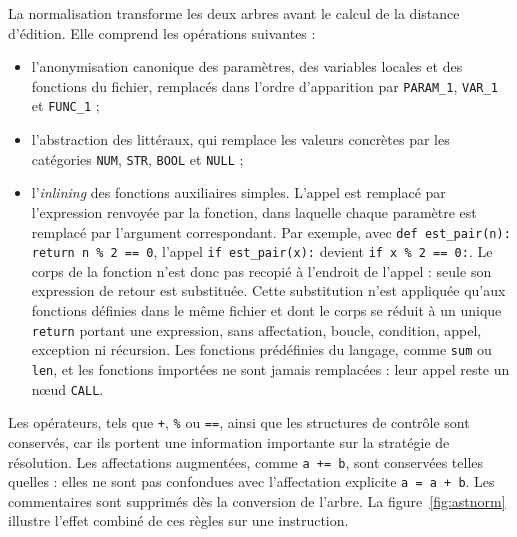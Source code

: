 \documentclass[12pt,a4paper,oneside]{report}
\begin{document}
La normalisation transforme les deux arbres avant le calcul de la distance
d'édition. Elle comprend les opérations suivantes :
\begin{itemize}
  \item l'anonymisation canonique des paramètres, des variables locales et des
        fonctions du fichier, remplacés dans l'ordre d'apparition par
        \texttt{PARAM\_1}, \texttt{VAR\_1} et \texttt{FUNC\_1} ;
  \item l'abstraction des littéraux, qui remplace les valeurs concrètes par les
        catégories \texttt{NUM}, \texttt{STR}, \texttt{BOOL} et \texttt{NULL} ;
  \item l'\emph{inlining} des fonctions auxiliaires simples. L'appel est
        remplacé par l'expression renvoyée par la fonction, dans laquelle
        chaque paramètre est remplacé par l'argument correspondant. Par
        exemple, avec \texttt{def est\_pair(n): return n \% 2 == 0},
        l'appel \texttt{if est\_pair(x):} devient \texttt{if x \% 2 == 0:}.
        Le corps de la fonction n'est donc pas recopié à l'endroit de
        l'appel : seule son expression de retour est substituée. Cette
        substitution n'est appliquée qu'aux fonctions définies dans le même
        fichier et dont le corps se réduit à un unique \texttt{return}
        portant une expression, sans affectation, boucle, condition, appel,
        exception ni récursion. Les fonctions prédéfinies du langage, comme
        \texttt{sum} ou \texttt{len}, et les fonctions importées ne sont
        jamais remplacées : leur appel reste un nœud \texttt{CALL}.
\end{itemize}

Les opérateurs, tels que \texttt{+}, \texttt{\%} ou \texttt{==}, ainsi que les
structures de contrôle sont conservés, car ils portent une information
importante sur la stratégie de résolution. Les affectations augmentées, comme
\texttt{a += b}, sont conservées telles quelles : elles ne sont pas confondues
avec l'affectation explicite \texttt{a = a + b}. Les commentaires sont
supprimés dès la conversion de l'arbre. La figure~\ref{fig:astnorm} illustre l'effet combiné
de ces règles sur une instruction.
\end{document}
